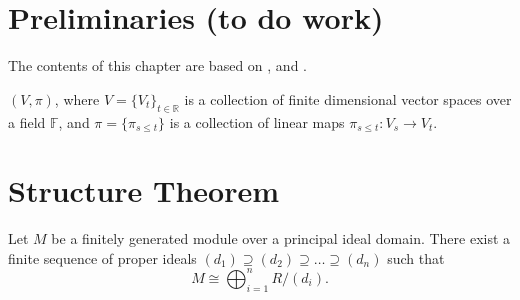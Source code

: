 \section{Preliminaries (to do work)}
The contents of this chapter are based on \cite{nanda}, \cite{polterovich} and \cite{wang}.

\begin{definition}
    
\end{definition}

\begin{definition}
    
\end{definition}

\begin{definition}
    
\end{definition}

\begin{definition}
    $ (V, \pi) $, where $ V = \{V_t\}_{t \in \mathbb R} $ is a collection of finite dimensional vector spaces over a field $ \mathbb F $, and $ \pi = \{ \pi_{s \leq t} \} $ is a collection of linear maps $ \pi_{s \leq t}: V_s \rightarrow V_t $.
\end{definition}

\begin{definition}[Barcode]

\end{definition}

\begin{definition}
    
\end{definition}

\begin{definition}
    
\end{definition}

\begin{definition}
    
\end{definition}

\begin{definition}
    
\end{definition}

\newpage
\section{Structure Theorem}
\begin{fact} \label{structure-pure}
    Let $ M $ be a  finitely generated module over a principal ideal domain. There exist a finite sequence of proper ideals $ (d_1) \supseteq (d_2) \supseteq \dots \supseteq (d_n) $ such that
    $$
        M \cong \bigoplus_{i=1}^n R / (d_i).
    $$

\end{fact}

